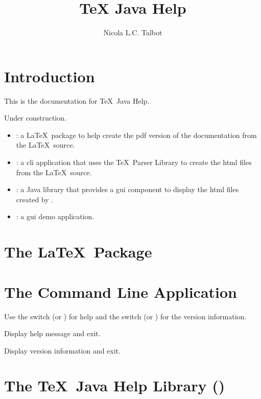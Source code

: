 \documentclass[toc=listof]{scrreport}
\title{\texorpdfstring{\TeX}{TeX} Java Help}
\author{Nicola L.C. Talbot}
\begin{document}
\maketitle
\tableofcontents

\chapter{Introduction}
\label{sec:intro}

This is the documentation for \TeX\ Java Help.

\begin{warning}
Under construction.
\end{warning}

\begin{itemize}
\item {}: a \LaTeX\ package to help create the \gls{pdf} version of
the documentation from the \LaTeX\ source.

\item {}: a \gls{cli} application that uses the \TeX\ Parser
Library to create the \gls{html} files from the \LaTeX\ source.

\item {}: a Java library that provides a \gls{gui} 
component to display the \gls{html} files created by .

\item {}: a \gls{gui} demo application.
\end{itemize}

\chapter{The  \LaTeX\ Package}
\label{sec:texjavahelpsty}


\chapter{The  Command Line Application}
\label{sec:texjavahelpmk}


Use the  switch 
(or ) for help and the
 switch
(or ) for the version information.

Display help message and exit.

Display version information and exit.

\chapter{The \TeX\ Java Help Library ()}


\printterms

\printindex
\end{document}
